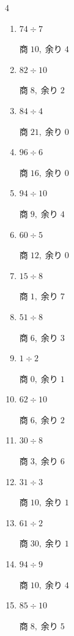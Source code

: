 \begin{multicols}{4}
\begin{enumerate}
        $商\; 0,\; 余り\; 5$

  \item $74 \div 7$

        $商\; 10,\; 余り\; 4$

  \item $82 \div 10$

        $商\; 8,\; 余り\; 2$

  \item $84 \div 4$

        $商\; 21,\; 余り\; 0$

  \item $96 \div 6$

        $商\; 16,\; 余り\; 0$

  \item $94 \div 10$

        $商\; 9,\; 余り\; 4$

  \item $60 \div 5$

        $商\; 12,\; 余り\; 0$

  \item $15 \div 8$

        $商\; 1,\; 余り\; 7$

  \item $51 \div 8$

        $商\; 6,\; 余り\; 3$

  \item $1 \div 2$

        $商\; 0,\; 余り\; 1$

  \item $62 \div 10$

        $商\; 6,\; 余り\; 2$

  \item $30 \div 8$

        $商\; 3,\; 余り\; 6$

  \item $31 \div 3$

        $商\; 10,\; 余り\; 1$

  \item $61 \div 2$

        $商\; 30,\; 余り\; 1$

  \item $94 \div 9$

        $商\; 10,\; 余り\; 4$

  \item $85 \div 10$

        $商\; 8,\; 余り\; 5$


\end{enumerate}
\end{multicols}
